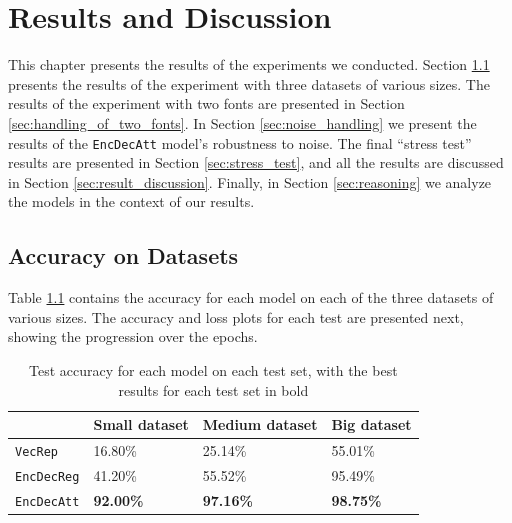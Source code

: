 
\chapter{Results and Discussion}
\label{ch:results}
This chapter presents the results of the experiments we conducted. Section \ref{sec:accuracy_on_datasets_results} presents the results of the experiment with three datasets of various sizes. The results of the experiment with two fonts are presented in Section \ref{sec:handling_of_two_fonts}. In Section \ref{sec:noise_handling} we present the results of the {\tt EncDecAtt} model's robustness to noise. The final ``stress test'' results are presented in Section \ref{sec:stress_test}, and all the results are discussed in Section \ref{sec:result_discussion}. Finally, in Section \ref{sec:reasoning} we analyze the models in the context of our results.


\section{Accuracy on Datasets}
\label{sec:accuracy_on_datasets_results}
Table \ref{table:accuracy_model_data_sets} contains the accuracy for each model on each of the three datasets of various sizes. The accuracy and loss plots for each test are presented next, showing the progression over the epochs.

\begin{table}[h]
    \centering
    \begin{tabular}{|l|l|l|l|}
        \hline 
                                        & \textbf{Small dataset}          & \textbf{Medium dataset}         & \textbf{Big dataset}            \\ \hline
        {\tt VecRep }                   & 16.80\%                         & 25.14\%                         & 55.01\%                         \\ \hline
        {\tt EncDecReg}                 & 41.20\%                         & 55.52\%                         & 95.49\%                         \\ \hline
        {\tt EncDecAtt}                 & \textbf{92.00\%}                & \textbf{97.16\%}                & \textbf{98.75\%}                \\ \hline
    \end{tabular}
    \captionsetup{justification=centering}
    \caption{Test accuracy for each model on each test set, with the best results for each test set in bold}
    \label{table:accuracy_model_data_sets}
\end{table}

